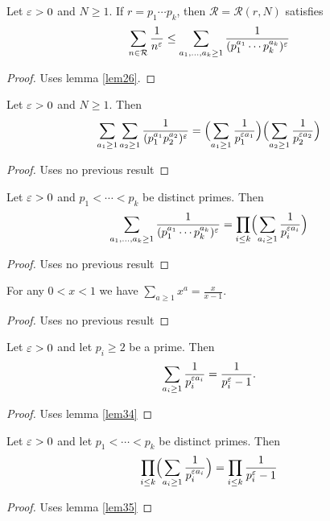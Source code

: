 \begin{lemma} \label{lem31} 
Let $\varepsilon>0$ and $N\ge1$. If $r=p_1\cdots p_k$, then $\mathcal{R} = \mathcal{R}(r,N)$ satisfies
\[
\sum_{n\in \mathcal{R}}\frac{1}{n^{\varepsilon}} 
\le \sum_{a_1,\ldots, a_k\ge1} \frac{1}{(p_1^{a_1}\cdots p_k^{a_k})^\varepsilon}
\]
\end{lemma}
\begin{proof}\leanok
{}
Uses lemma \ref{lem26}.
\end{proof}

\begin{lemma} \label{lem32} 
Let $\varepsilon>0$ and $N\ge1$. Then
\[
\sum_{a_1\ge1}\sum_{a_2\ge1} \frac{1}{(p_1^{a_1}p_2^{a_2})^\varepsilon} = \Bigl(\sum_{a_1\ge1} \frac{1}{p_1^{\varepsilon a_1}}\Bigr) \Bigl(\sum_{a_2\ge1} \frac{1}{p_2^{\varepsilon a_2}}\Bigr)
\]
\end{lemma}
\begin{proof}\leanok
\uses{}
Uses no previous result
\end{proof}

\begin{lemma} \label{lem33} 
Let $\varepsilon>0$ and $p_1<\cdots<p_k$ be distinct primes. Then
\[
\sum_{a_1,\ldots, a_k\ge1} \frac{1}{(p_1^{a_1}\cdots p_k^{a_k})^\varepsilon}
= \prod_{i\le k} \Bigl(\sum_{a_i\ge1} \frac{1}{p_i^{\varepsilon a_i}}\Bigr)
\]
\end{lemma}
\begin{proof}\leanok
\uses{}
Uses no previous result
\end{proof}

\begin{theorem} \label{lem34} 
For any $0<x<1$ we have $\sum_{a\ge1} x^a = \frac{x}{x-1}$.
\end{theorem}
\begin{proof}\leanok
\uses{}
Uses no previous result
\end{proof}

\begin{lemma} \label{lem35} 
Let $\varepsilon>0$ and let $p_i\ge2$ be a prime. Then
\[
\sum_{a_i\ge1} \frac{1}{p_i^{\varepsilon a_i}} = \frac{1}{p_i^\varepsilon-1}.
\]
\end{lemma}
\begin{proof}\leanok
{}
Uses lemma \ref{lem34}
\end{proof}

\begin{lemma} \label{lem36} 
Let $\varepsilon>0$ and let $p_1<\cdots<p_k$ be distinct primes. Then
\[
\prod_{i\le k} \Bigl(\sum_{a_i\ge1} \frac{1}{p_i^{\varepsilon a_i}}\Bigr)
=\prod_{i\le k} \frac{1}{p_i^\varepsilon-1}
\]
\end{lemma}
\begin{proof}\leanok
{}
Uses lemma \ref{lem35}
\end{proof}


